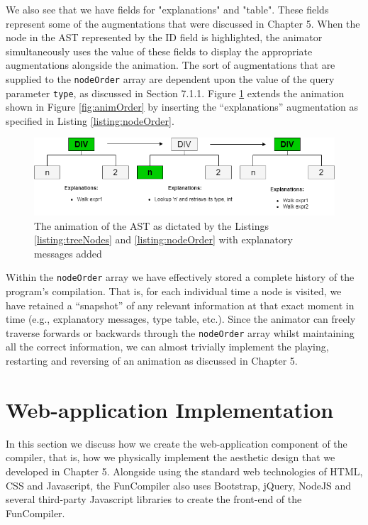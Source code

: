 \documentclass{l4proj}
\begin{document}
We also see that we have fields for "explanations" and "table". These fields represent some of the augmentations that were discussed in Chapter 5. When the node in the AST represented by the ID field is highlighted, the animator simultaneously uses the value of these fields to display the appropriate augmentations alongside the animation. The sort of augmentations that are supplied to the \texttt{nodeOrder} array are dependent upon the value of the query parameter \texttt{type}, as discussed in Section 7.1.1. Figure \ref{fig:animAugs} extends the animation shown in Figure \ref{fig:animOrder} by inserting the ``explanations'' augmentation as specified in Listing \ref{listing:nodeOrder}.
\begin{figure}[h]
\centering
\includegraphics[scale=0.65]{images/animAugs.png}
\caption{The animation of the AST as dictated by the Listings \ref{listing:treeNodes} and \ref{listing:nodeOrder} with explanatory messages added}
\label{fig:animAugs}	
\end{figure}

Within the \texttt{nodeOrder} array we have effectively stored a complete history of the program's compilation. That is, for each individual time a node is visited, we have retained a ``snapshot'' of any relevant information at that exact moment in time (e.g., explanatory messages, type table, etc.). Since the animator can freely traverse forwards or backwards through the \texttt{nodeOrder} array whilst maintaining all the correct information, we can almost trivially implement the playing, restarting and reversing of an animation as discussed in Chapter 5.

\section{Web-application Implementation}
In this section we discuss how we create the web-application component of the compiler, that is, how we physically implement the aesthetic design that we developed in Chapter 5. Alongside using the standard web technologies of HTML, CSS and Javascript, the FunCompiler also uses Bootstrap, jQuery, NodeJS and several third-party Javascript libraries to create the front-end of the FunCompiler.
\end{document}
